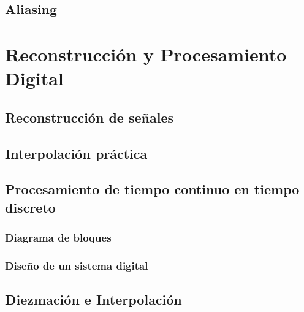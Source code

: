 \documentclass[11pt,a4paper,openany]{book}
\begin{document}
\section{Aliasing}


\chapter{Reconstrucción y Procesamiento Digital}

\section{Reconstrucción de señales}

\section{Interpolación práctica}

\section{Procesamiento de tiempo continuo en tiempo discreto}

\subsection{Diagrama de bloques}

\subsection{Diseño de un sistema digital}

\section{Diezmación e Interpolación}



\cleardoublepage
{}
{}
\end{document}
